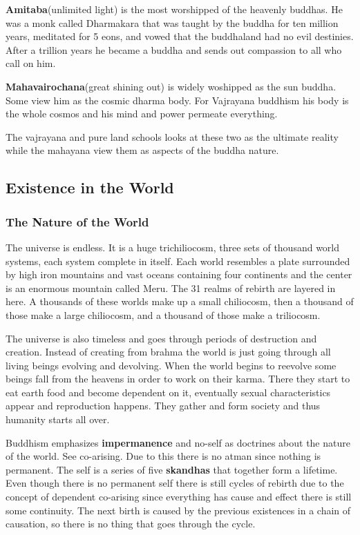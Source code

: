 \documentclass{article}
\begin{document}
\textbf{Amitaba}(unlimited light) is the most worshipped of the heavenly buddhas. He was a monk called Dharmakara that was taught by the buddha for ten million years, meditated for 5 eons, and vowed that the buddhaland had no evil destinies. After a trillion years he became a buddha and sends out compassion to all who call on him.

\textbf{Mahavairochana}(great shining out) is widely woshipped as the sun buddha. Some view him as the cosmic dharma body. For Vajrayana buddhism his body is the whole cosmos and his mind and power permeate everything.

The vajrayana and pure land schools looks at these two as the ultimate reality while the mahayana view them as aspects of the buddha nature.

\subsection*{Existence in the World}
\label{sub:existence_in_the_world}
\subsubsection*{The Nature of the World}
\label{ssub:the_nature_of_the_world}
The universe is endless. It is a huge trichiliocosm, three sets of thousand world systems, each system complete in itself. Each world resembles a plate surrounded by high iron mountains and vast oceans containing four continents and the center is an enormous mountain called Meru. The 31 realms of rebirth are layered in here. A thousands of these worlds make up a small chiliocosm, then a thousand of those make a large chiliocosm, and a thousand of those make a triliocosm.

The universe is also timeless and goes through periods of destruction and creation. Instead of creating from brahma the world is just going through all living beings evolving and devolving. When the world begins to reevolve some beings fall from the heavens in order to work on their karma. There they start to eat earth food and become dependent on it, eventually sexual characteristics appear and reproduction happens. They gather and form society  and thus humanity starts all over.

Buddhism emphasizes \textbf{impermanence} and no-self as doctrines about the nature of the world. See co-arising. Due to this there is no atman since nothing is permanent. The self is a series of five \textbf{skandhas} that together form a lifetime. Even though there is no permanent self there is still cycles of rebirth due to the concept of dependent co-arising since everything has cause and effect there is still some continuity. The next birth is caused by the previous existences in a chain of causation, so there is no thing that goes through the cycle.
\end{document}
